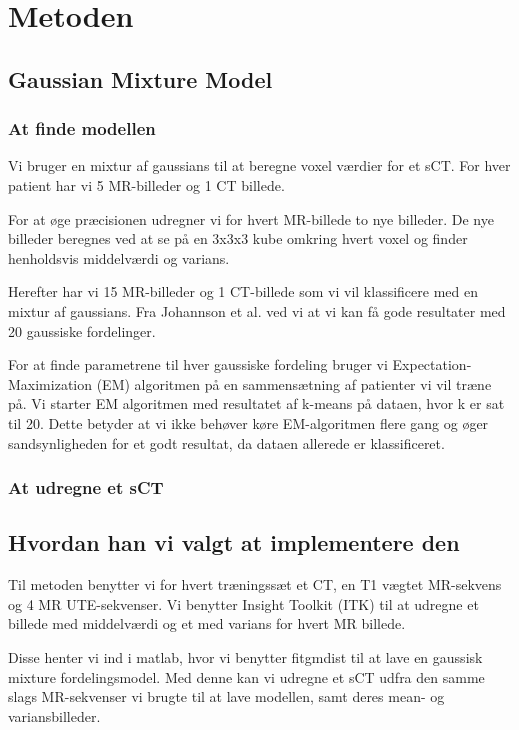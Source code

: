 \section{Metoden}
\subsection{Gaussian Mixture Model}

\subsubsection{At finde modellen}
Vi bruger en mixtur af gaussians til at beregne voxel værdier
for et sCT. For hver patient har vi 5 MR-billeder og 1 CT billede.

For at øge præcisionen udregner vi for hvert MR-billede
to nye billeder. De nye billeder beregnes ved at se på en 3x3x3
kube omkring hvert voxel og finder henholdsvis middelværdi og varians.

Herefter har vi 15 MR-billeder og 1 CT-billede som vi vil klassificere
med en mixtur af gaussians. Fra Johannson et al. ved vi at vi kan få
gode resultater med 20 gaussiske fordelinger. 

For at finde parametrene til hver gaussiske fordeling bruger vi
Expectation-Maximization (EM) algoritmen på en sammensætning af patienter
vi vil træne på. Vi starter EM algoritmen med resultatet af k-means på
dataen, hvor k er sat til 20. Dette betyder at vi ikke behøver køre
EM-algoritmen flere gang og øger sandsynligheden for et godt resultat, da
dataen allerede er klassificeret.




\subsubsection{At udregne et sCT}


\subsection{Hvordan han vi valgt at implementere den}


Til metoden benytter vi for hvert træningssæt et CT, en T1 vægtet MR-sekvens
og 4 MR UTE-sekvenser. Vi benytter Insight Toolkit (ITK) til at udregne et
billede med middelværdi og et med varians for hvert MR billede.

Disse henter vi ind i matlab, hvor vi benytter fitgmdist til at lave en
gaussisk mixture fordelingsmodel. Med denne kan vi udregne et sCT udfra den
samme slags MR-sekvenser vi brugte til at lave modellen, samt deres
mean- og variansbilleder.
